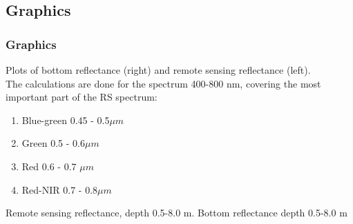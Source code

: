 \documentclass[pdflatex,compress]{beamer}
\begin{document}
\subsection{Graphics}
\begin{frame}\frametitle{Graphics}
\scriptsize{Plots of bottom reflectance (right) and remote sensing reflectance (left). \\
The calculations are done for the spectrum 400-800 nm, covering the most important part of the RS spectrum:
\begin{enumerate}
	\item Blue-green 0.45 - 0.5$\mu m$ 
	\item Green 0.5 - 0.6$\mu m$
	\item Red 0.6 - 0.7 $\mu m$
	\item Red-NIR 0.7 - 0.8$\mu m$
\end{enumerate}}
\begin{figure}[H]
	\centering
			\hspace{5mm}
\end{figure}
Remote sensing reflectance, depth 0.5-8.0 m. Bottom reflectance depth 0.5-8.0 m
\end{frame}
\end{document}
